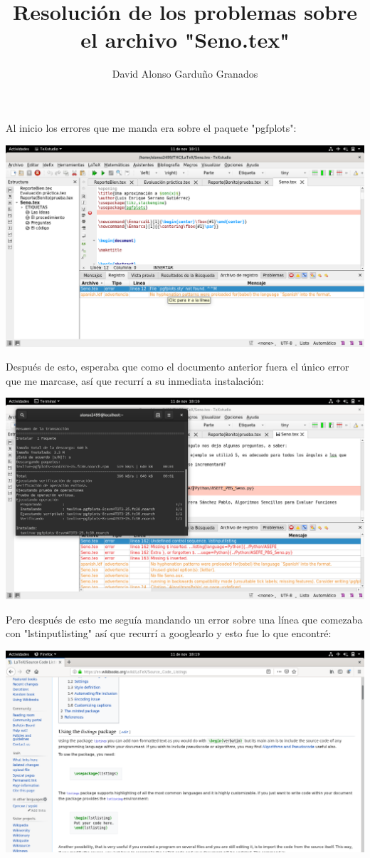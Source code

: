 \documentclass[french]{article}
\title{Resolución de los problemas sobre el archivo "Seno.tex"}
\author{David Alonso Garduño Granados}
\begin{document}
	\maketitle
	
Al inicio los errores que me manda era sobre el paquete "pgfplots":

\includegraphics[scale=0.20]{Imagenes/ER4.png} 

Después de esto, esperaba que como el documento anterior fuera el único error que me marcase, así que recurrí a su inmediata instalación:

\includegraphics[scale=0.20]{Imagenes/ER3.png}

Pero después de esto me seguía mandando un error sobre una línea que comezaba con "lstinputlisting" así que recurrí a googlearlo y esto fue lo que encontré:

\includegraphics[scale=0.20]{Imagenes/ER2.png}
\end{document}
